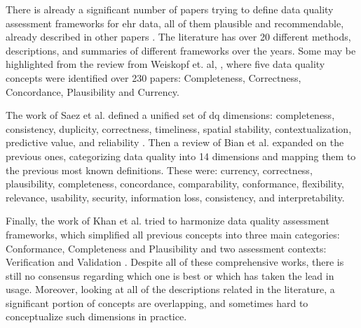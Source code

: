 There is already a significant number of papers trying to define data quality assessment frameworks for \ac{ehr} data, all of them plausible and recommendable, already described in other papers \cite{bianAssessingPracticeData2020}. The literature has over 20 different methods, descriptions, and summaries of  different frameworks over the years. Some may be highlighted from the review from Weiskopf et. al, \cite{weiskopfMethodsDimensionsElectronic2013}, where five data quality concepts were identified over 230 papers: Completeness, Correctness, Concordance, Plausibility and Currency. 



The work of Saez et al. defined a unified set of \ac{dq} dimensions: completeness, consistency, duplicity, correctness, timeliness, spatial stability, contextualization, predictive value, and reliability \cite{saezOrganizingDataQuality2012}. Then a review of Bian et al. \cite{bianAssessingPracticeData2020} expanded on the previous ones, categorizing data quality into 14 dimensions and mapping them to the previous most known definitions. These were: currency, correctness, plausibility, completeness, concordance, comparability, conformance, flexibility, relevance, usability, security, information loss, consistency, and interpretability.

Finally, the work of Khan et al. tried to harmonize data quality assessment frameworks, which simplified all previous concepts into three main categories: Conformance, Completeness and Plausibility and two assessment contexts: Verification and Validation \cite{kahnHarmonizedDataQuality2016a}.
Despite all of these comprehensive works, there is still no consensus regarding which one is best or which has taken the lead in usage. Moreover, looking at all of the descriptions related in the literature, a significant portion of concepts are overlapping, and sometimes hard to conceptualize such dimensions in practice.

